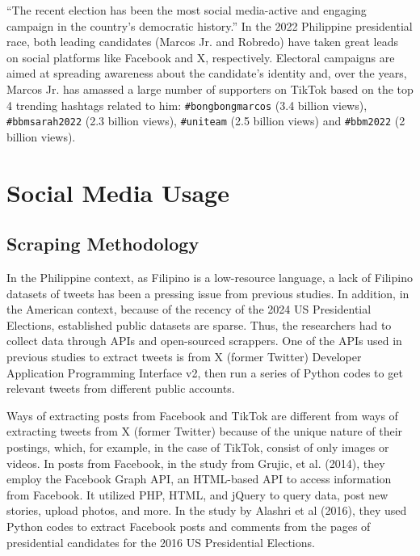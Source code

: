 “The recent election has been the most social media-active and engaging campaign in the country’s democratic history.” In the 2022 Philippine presidential race, both leading candidates (Marcos Jr. and Robredo) have taken great leads on social platforms like Facebook and X, respectively.\cite{RRL_Ampon-2023} Electoral campaigns are aimed at spreading awareness about the candidate’s identity and, over the years, Marcos Jr. has amassed a large number of supporters on TikTok based on the top 4 trending hashtags related to him: \texttt{\#bongbongmarcos} (3.4 billion views), \texttt{\#bbmsarah2022} (2.3 billion views), \texttt{\#uniteam} (2.5 billion views) and \texttt{\#bbm2022} (2 billion views).\cite{RRL_Mendoza-2022}

\section{Social Media Usage}

\subsection{Scraping Methodology}
In the Philippine context, as Filipino is a low-resource language, a lack of Filipino datasets of tweets has been a pressing issue from previous studies. In addition, in the American context, because of the recency of the 2024 US Presidential Elections, established public datasets are sparse. Thus, the researchers had to collect data through APIs and open-sourced scrappers. One of the APIs used in previous studies to extract tweets is from X (former Twitter) Developer Application Programming Interface v2, then run a series of Python codes to get relevant tweets from different public accounts.\cite{RRL_Aquino-2025,RRL_Ancheta-2020}

Ways of extracting posts from Facebook and TikTok are different from ways of extracting tweets from X (former Twitter) because of the unique nature of their postings, which, for example, in the case of TikTok, consist of only images or videos. In posts from Facebook, in the study from Grujic, et al. (2014), they employ the Facebook Graph API, an HTML-based API to access information from Facebook.\cite{RRL_Grujic-2014} It utilized PHP, HTML, and jQuery to query data, post new stories, upload photos, and more. In the study by Alashri et al (2016), they used Python codes to extract Facebook posts and comments from the pages of presidential candidates for the 2016 US Presidential Elections.\cite{RRL_Alashri-2016}

